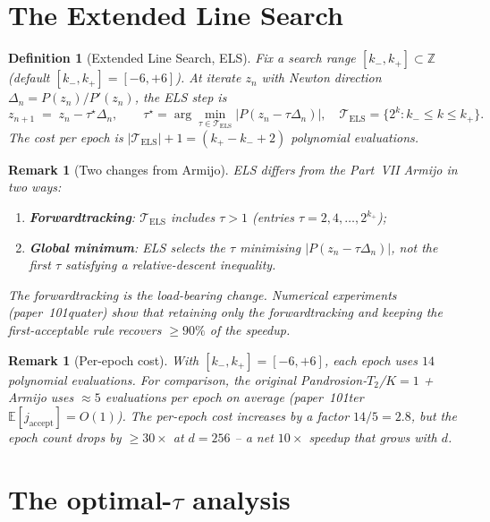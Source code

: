 \documentclass[11pt,a4paper]{article}
\newtheorem{definition}[theorem]{Definition}
\newtheorem{remark}[theorem]{Remark}
\begin{document}
\section{The Extended Line Search}\label{sec:ELS}

\begin{definition}[Extended Line Search, ELS]\label{def:ELS}
Fix a search range $[k_-, k_+] \subset \mathbb{Z}$ (default $[k_-, k_+] = [-6, +6]$). At iterate $z_n$ with Newton direction $\Delta_n = P(z_n)/P'(z_n)$, the ELS step is
\begin{equation}\label{eq:ELS-step}
z_{n+1} \;=\; z_n - \tau^\star \Delta_n, \qquad \tau^\star = \arg\min_{\tau \in \mathcal{T}_{\text{ELS}}} |P(z_n - \tau \Delta_n)|, \quad \mathcal{T}_{\text{ELS}} = \{2^k : k_- \le k \le k_+\}.
\end{equation}
The cost per epoch is $|\mathcal{T}_{\text{ELS}}| + 1 = (k_+ - k_- + 2)$ polynomial evaluations.
\end{definition}

\begin{remark}[Two changes from Armijo]
ELS differs from the Part~VII Armijo in two ways:
\begin{enumerate}
\item \textbf{Forwardtracking}: $\mathcal{T}_{\text{ELS}}$ includes $\tau > 1$ (entries $\tau = 2, 4, \dots, 2^{k_+}$);
\item \textbf{Global minimum}: ELS selects the $\tau$ minimising $|P(z_n - \tau \Delta_n)|$, not the first $\tau$ satisfying a relative-descent inequality.
\end{enumerate}
The forwardtracking is the load-bearing change. Numerical experiments (paper~101quater) show that retaining only the forwardtracking and keeping the first-acceptable rule recovers $\ge 90\%$ of the speedup.
\end{remark}

\begin{remark}[Per-epoch cost]
With $[k_-, k_+] = [-6, +6]$, each epoch uses $14$ polynomial evaluations. For comparison, the original Pandrosion-$T_2$/$K{=}1$ + Armijo uses $\approx 5$ evaluations per epoch on average (paper~101ter $\mathbb{E}[j_{\text{accept}}] = O(1)$). The per-epoch cost increases by a factor $14/5 = 2.8$, but the epoch count drops by $\ge 30\times$ at $d = 256$ -- a net $10\times$ speedup that grows with $d$.
\end{remark}

\section{The optimal-$\tau$ analysis}\label{sec:theory}
\end{document}
